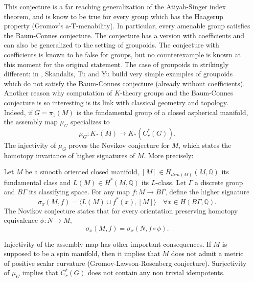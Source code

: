 This conjecture is a far reaching generalization of the Atiyah-Singer index theorem, and is know to be true for every group which has the Haagerup property (Gromov's a-T-menability). In particular, every amenable group satisfies the Baum-Connes conjecture. The conjecture has a version with coefficients and can also be generalized to the setting of groupoids. The conjecture with coefficients is known to be false for groups, but no counterexample is known at this moment for the original statement. The case of groupoids in strikingly different: in \cite{SkTuYu}, Skandalis, Tu and Yu build very simple examples of groupoids which do not satisfy the Baum-Connes conjecture (already without coefficients).\\

Another reason why computation of $K$-theory groups and the Baum-Connes conjecture is so interesting is its link with classical geometry and topology. Indeed, if $G=\pi_1(M)$ is the fundamental group of a closed aspherical manifold, the assembly map $\mu_G$ specializes to 
\[\mu_G : K_*(M)\rightarrow K_*(C^*_r(G)).\]
The injectivity of $\mu_G$ proves the Novikov conjecture for $M$, which states the homotopy invariance of higher signatures of $M$. More precisely:

\begin{conjecture} Let $M$ be a smooth oriented closed manifold, 
$[M]\in H_{dim(M)}(M,\mathbb Q)$ its fundamental class and
$ L(M)\in H^{*}(M,\mathbb Q)$ its $L$-class. Let $\Gamma$ a discrete group and $B\Gamma$ its classifying space. 
For any map $f: M \rightarrow B\Gamma$, define the higher signature 
\[\sigma_x(M,f) = \langle L(M)\cup f^*(x),[M] \rangle \quad \forall x \in H(B\Gamma, \mathbb Q).\]
The Novikov conjecture states that for every orientation preserving homotopy equivalence $\phi : N\rightarrow M$,
\[\sigma_x(M,f)= \sigma_x(N,f\circ \phi).\]
\end{conjecture}

Injectivity of the assembly map has other important consequences. If $M$ is supposed to be a spin manifold, then it implies that $M$ does not admit a metric of positive scalar curvature (Gromov-Lawson-Rosenberg conjecture). Surjectivity of $\mu_G$ implies that $C^*_r(G)$ does not contain any non trivial idempotents.\\

